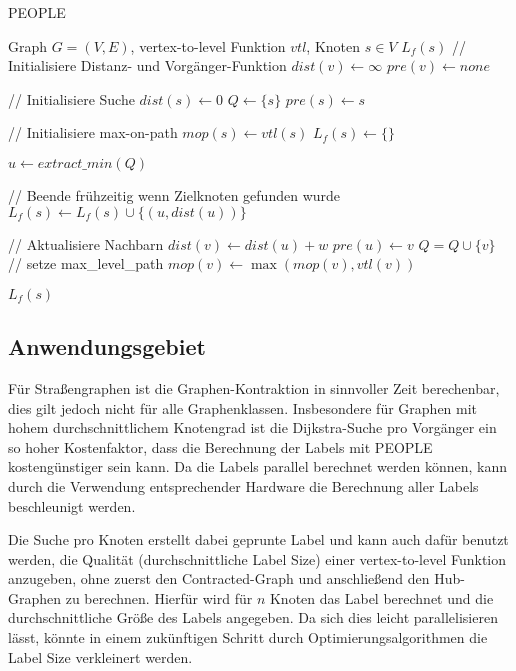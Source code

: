 \begin{algorithm}[p]
  \caption{PEOPLE}
  \begin{algorithmic}[1]
    \Require Graph $G = (V, E)$, vertex-to-level Funktion ${vtl}$, Knoten $s \in V$
    \Ensure $L_f (s)$
    \State // Initialisiere Distanz- und Vorgänger-Funktion
    \State ${dist}(v) \leftarrow \infty$
    \State ${pre}(v) \leftarrow {none}$
    \EndFor

    \State
    \State // Initialisiere Suche
    \State ${dist}(s) \leftarrow 0$
    \State $Q\leftarrow \{ s \}$
    \State ${pre}(s) \leftarrow s$

    \State
    \State // Initialisiere max-on-path
    \State ${mop}(s) \leftarrow {vtl}(s)$
    \State $L_f (s) \leftarrow \{ \}$

    \State
    \State $u \leftarrow{extract\_min}(Q)$\label{graphs:dijkstra:pop}

    \State
    \State // Beende frühzeitig wenn Zielknoten gefunden wurde
    \State $L_f (s) \leftarrow L_f (s) \cup \{ (u, {dist}(u)) \}$
    \EndIf

    \State
    \State // Aktualisiere Nachbarn
    \State ${dist}(v) \leftarrow {dist}(u) + w$
    \State ${pre}(u) \leftarrow v$
    \State $Q = Q \cup \{ v \}$
    \State
    \State // setze max\_level\_path
    \State ${mop}(v) \leftarrow \max({mop}(v), {vtl}(v))$
    \EndIf
    \EndFor

    \EndWhile

    \State
    \State \Return $L_f (s)$
  \end{algorithmic}
  \label{alg:people:people}
\end{algorithm}

\subsection{Anwendungsgebiet}

Für Straßengraphen ist die Graphen-Kontraktion in sinnvoller Zeit berechenbar, dies gilt jedoch nicht für alle Graphenklassen.
Insbesondere für Graphen mit hohem durchschnittlichem Knotengrad ist die Dijkstra-Suche pro Vorgänger ein so hoher Kostenfaktor, dass die Berechnung der Labels mit PEOPLE kostengünstiger sein kann.
Da die Labels parallel berechnet werden können, kann durch die Verwendung entsprechender Hardware die Berechnung aller Labels beschleunigt werden.

Die Suche pro Knoten erstellt dabei geprunte Label und kann auch dafür benutzt werden, die Qualität (durchschnittliche Label Size) einer vertex-to-level Funktion anzugeben, ohne zuerst den Contracted-Graph und anschließend den Hub-Graphen zu berechnen.
Hierfür wird für $n$ Knoten das Label berechnet und die durchschnittliche Größe des Labels angegeben.
Da sich dies leicht parallelisieren lässt, könnte in einem zukünftigen Schritt durch Optimierungsalgorithmen die Label Size verkleinert werden.
